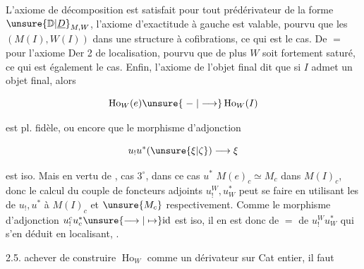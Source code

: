 
L'axiome de décomposition est satisfait pour
tout prédérivateur de la forme $\unsure{\mathbb{D}|\underline{D}}_{M,W}$, 
 l'axiome d'exactitude à gauche  est valable,
pourvu que les $(M(I),W(I))$  dans
une structure à cofibrations, ce qui est le cas.
De $=$ pour l'axiome Der 2 de localisation,
pourvu que de plus $W$ soit fortement
saturé, ce qui est également le cas. Enfin,
l'axiome de l'objet final dit que si
$I$ admet un objet final, alors

\[
 \operatorname{Ho}_W(e)\unsure{\;-\;|\longrightarrow}\operatorname{Ho}_W(I)
\]

est pl. fidèle, ou encore que le morphisme
d'adjonction

\[
 u_!u^*(\unsure{\xi|\zeta})\longrightarrow \xi
\]

est iso. Mais en vertu de , cas $3^\circ$,
dans ce cas $u^*$  $M(e)_c\simeq M_c$ dans
$M(I)_c$, donc le calcul du couple de
foncteurs adjoints $u_!^W,u^*_W$ peut se faire en
utilisant les  de $u_!,u^*$ à $M(I)_c$ et
$\unsure{M_c}$ respectivement. Comme le morphisme
d'adjonction $u_!^c u_c^*\unsure{\longrightarrow|\mapsto}\mathrm{id}$ est iso, il en
est donc de $=$ de $u_!^W u^*_W$ qui s'en
déduit en localisant, .

2.5.  achever de construire $\operatorname{Ho}_W$ comme
un dérivateur sur Cat  entier, il faut
